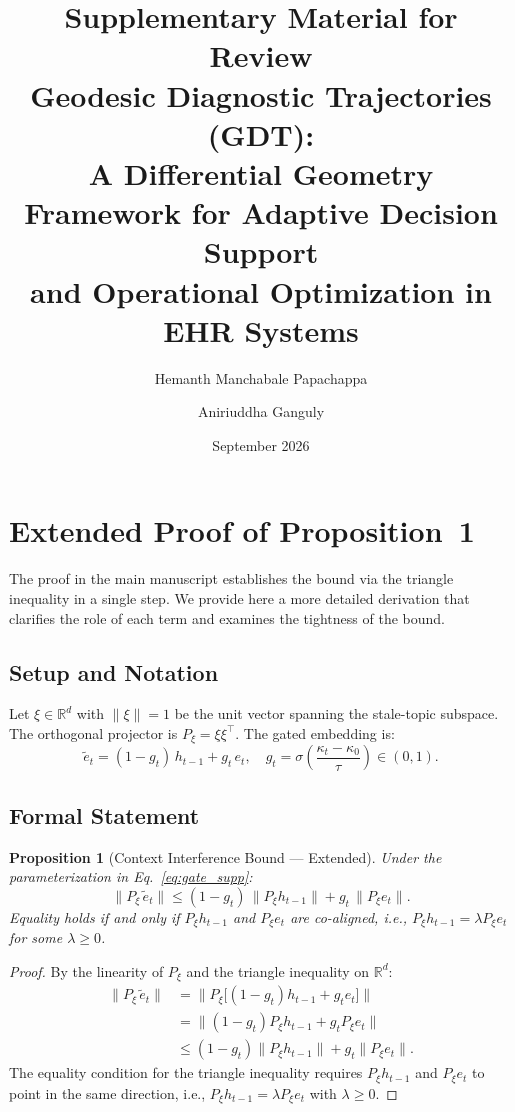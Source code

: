 \documentclass[11pt]{article}
\title{Supplementary Material for Review\\
\large Geodesic Diagnostic Trajectories (GDT):\\
A Differential Geometry Framework for Adaptive Decision Support\\
and Operational Optimization in EHR Systems}
\author{Hemanth Manchabale Papachappa \and Aniriuddha Ganguly}
\date{September 2026}
\newtheorem{proposition}{Proposition}
\begin{document}
\maketitle
\tableofcontents
\newpage

\section{Extended Proof of Proposition~1}
\label{sec:proof_extended}

The proof in the main manuscript establishes the bound via the triangle inequality
in a single step. We provide here a more detailed derivation that clarifies the
role of each term and examines the tightness of the bound.

\subsection{Setup and Notation}
Let $\xi \in \mathbb{R}^d$ with $\|\xi\| = 1$ be the unit vector spanning the
stale-topic subspace. The orthogonal projector is $P_\xi = \xi\xi^\top$. The
gated embedding is:
\begin{equation}
  \tilde{e}_t = (1 - g_t)\,h_{t-1} + g_t\,e_t,
  \quad g_t = \sigma\!\left(\frac{\kappa_t - \kappa_0}{\tau}\right) \in (0,1).
  \label{eq:gate_supp}
\end{equation}

\subsection{Formal Statement}
\begin{proposition}[Context Interference Bound --- Extended]
\label{prop:interference_extended}
Under the parameterization in Eq.~\eqref{eq:gate_supp}:
\begin{equation}
  \|P_\xi\,\tilde{e}_t\| \leq (1-g_t)\,\|P_\xi h_{t-1}\| + g_t\,\|P_\xi e_t\|.
  \label{eq:bound_supp}
\end{equation}
Equality holds if and only if $P_\xi h_{t-1}$ and $P_\xi e_t$ are co-aligned,
i.e., $P_\xi h_{t-1} = \lambda P_\xi e_t$ for some $\lambda \geq 0$.
\end{proposition}

\begin{proof}
By the linearity of $P_\xi$ and the triangle inequality on $\mathbb{R}^d$:
\begin{align}
  \|P_\xi\,\tilde{e}_t\|
  &= \|P_\xi\bigl[(1-g_t)h_{t-1} + g_t e_t\bigr]\| \nonumber \\
  &= \|(1-g_t)P_\xi h_{t-1} + g_t P_\xi e_t\| \nonumber \\
  &\leq (1-g_t)\|P_\xi h_{t-1}\| + g_t\|P_\xi e_t\|.
\end{align}
The equality condition for the triangle inequality requires $P_\xi h_{t-1}$ and
$P_\xi e_t$ to point in the same direction, i.e., $P_\xi h_{t-1} = \lambda P_\xi e_t$
with $\lambda \geq 0$.
\end{proof}
\end{document}
